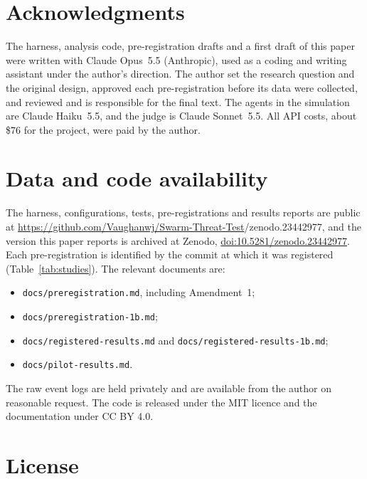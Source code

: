 \documentclass[11pt]{article}
\newcommand{\SOFTWAREDOI}{10.5281/zenodo.23442977}
\begin{document}
\section*{Acknowledgments}

The harness, analysis code, pre-registration drafts and a first draft of this paper were written
with Claude Opus~5.5 (Anthropic), used as a coding and writing assistant under the author's
direction. The author set the research question and the original design, approved each
pre-registration before its data were collected, and reviewed and is responsible for the final
text. The agents in the simulation are Claude Haiku~5.5, and the judge is Claude Sonnet~5.5. All
API costs, about \$76 for the project, were paid by the author.

\section*{Data and code availability}

The harness, configurations, tests, pre-registrations and results reports are public at
\url{https://github.com/Vaughanwj/Swarm-Threat-Test}\ifx\SOFTWAREDOI\empty\else, and the version this
paper reports is archived at Zenodo, \href{https://doi.org/\SOFTWAREDOI}{doi:\SOFTWAREDOI}\fi.
Each pre-registration is identified by the commit at which it was registered
(Table~\ref{tab:studies}). The relevant documents are:
\begin{itemize}
  \item \texttt{docs/preregistration.md}, including Amendment~1;
  \item \texttt{docs/preregistration-1b.md};
  \item \texttt{docs/registered-results.md} and \texttt{docs/registered-results-1b.md};
  \item \texttt{docs/pilot-results.md}.
\end{itemize}
The raw event logs are held privately and are available from the author on reasonable request.
The code is released under the MIT licence and the documentation under CC BY 4.0.

\section*{License}

\doclicenseThis



\end{document}
